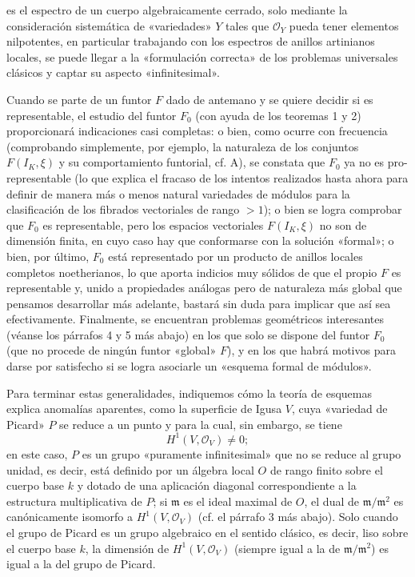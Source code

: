 \documentclass[11pt,twoside,openany]{book}
\numberwithin{equation}{section}
\newcommand{\src}[1]{%
  \phantomsection\hypertarget{src:#1}{}%
  \marginpar{\raggedleft\footnotesize\sffamily #1}%
}
\theoremstyle{plain}
\theoremstyle{definition}
\theoremstyle{remark}
\newcommand{\FgaUnitKey}{frontmatter}
\renewcommand{\src}[1]{%
  \phantomsection\hypertarget{src:\FgaUnitKey:#1}{}%
  \marginpar{\raggedleft\footnotesize\sffamily #1}%
}
\theoremstyle{plain}
\theoremstyle{definition}
\theoremstyle{remark}
\begin{document}
\src{380}
es el espectro de un cuerpo algebraicamente cerrado, solo mediante la
consideración sistemática de «variedades» $Y$ tales que $\mathcal O_Y$ pueda
tener elementos nilpotentes, en particular trabajando con los espectros de
anillos artinianos locales, se puede llegar a la «formulación correcta» de los
problemas universales clásicos y captar su aspecto «infinitesimal».

Cuando se parte de un funtor $F$ dado de antemano y se quiere decidir si es
representable, el estudio del funtor $F_0$ (con ayuda de los teoremas 1 y 2)
proporcionará indicaciones casi completas: o bien, como ocurre con frecuencia
(comprobando simplemente, por ejemplo, la naturaleza de los conjuntos
$F(I_K,\xi)$ y su comportamiento funtorial, cf. A), se constata que $F_0$ ya no
es pro-representable (lo que explica el fracaso de los intentos realizados
hasta ahora para definir de manera más o menos natural variedades de módulos
para la clasificación de los fibrados vectoriales de rango $>1$); o bien se
logra comprobar que $F_0$ es representable, pero los espacios vectoriales
$F(I_K,\xi)$ no son de dimensión finita, en cuyo caso hay que conformarse con
la solución «formal»; o bien, por último, $F_0$ está representado por un
producto de anillos locales completos noetherianos, lo que aporta indicios muy
sólidos de que el propio $F$ es representable y, unido a propiedades análogas
pero de naturaleza más global que pensamos desarrollar más adelante, bastará
sin duda para implicar que así sea efectivamente. Finalmente, se encuentran
problemas geométricos interesantes (véanse los párrafos 4 y 5 más abajo) en los
que solo se dispone del funtor $F_0$ (que no procede de ningún funtor «global»
$F$), y en los que habrá motivos para darse por satisfecho si se logra asociarle
un «esquema formal de módulos».

Para terminar estas generalidades, indiquemos cómo la teoría de esquemas
explica anomalías aparentes, como la superficie de Igusa $V$, cuya «variedad
de Picard» $P$ se reduce a un punto y para la cual, sin embargo, se tiene
\[
  H^1(V,\mathcal O_V)\ne 0 ;
\]
en este caso, $P$ es un grupo «puramente infinitesimal» que no se reduce al
grupo unidad, es decir, está definido por un álgebra local $O$ de rango finito
sobre el cuerpo base $k$ y dotado de una aplicación diagonal correspondiente a
la estructura multiplicativa de $P$; si $\mathfrak m$ es el ideal maximal de
$O$, el dual de $\mathfrak m/\mathfrak m^2$ es canónicamente isomorfo a
$H^1(V,\mathcal O_V)$ (cf. el párrafo 3 más abajo). Solo cuando el grupo de
Picard es un grupo algebraico en el sentido clásico, es decir, liso sobre el
cuerpo base $k$, la dimensión de $H^1(V,\mathcal O_V)$ (siempre igual a la de
$\mathfrak m/\mathfrak m^2$) es igual a la del grupo de Picard.
\end{document}
